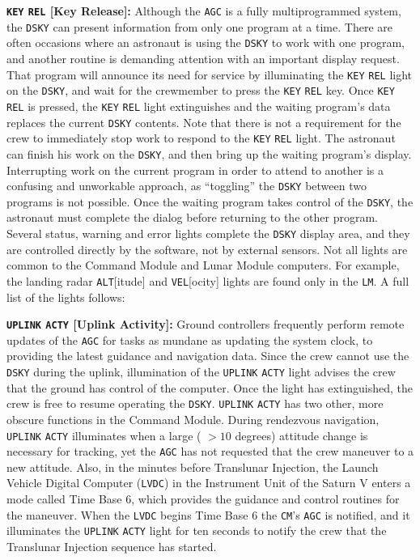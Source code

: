 \documentclass[refcap, oxford]{ahsan}
\begin{document}


\textbf{\texttt{KEY} \texttt{REL} [Key Release]:} Although the \texttt{AGC} is a fully multiprogrammed system, the \texttt{DSKY} can present information from only one program at a time. There are often occasions where an astronaut is using the \texttt{DSKY} to work with one program, and another routine is demanding attention with an important display request. That program will announce its need for service by illuminating the \texttt{KEY} \texttt{REL} light on the \texttt{DSKY}, and wait for the crewmember to press the \texttt{KEY} \texttt{REL} key. Once \texttt{KEY} \texttt{REL} is pressed, the \texttt{KEY} \texttt{REL} light extinguishes and the waiting program's data replaces the current \texttt{DSKY} contents. Note that there is not a requirement for the crew to immediately stop work to respond to the \texttt{KEY} \texttt{REL} light. The astronaut can finish his work on the \texttt{DSKY}, and then bring up the waiting program's display. Interrupting work on the current program in order to attend to another is a confusing and unworkable approach, as ``toggling'' the \texttt{DSKY} between two programs is not possible. Once the waiting program takes control of the \texttt{DSKY}, the astronaut must complete the dialog before returning to the other program. Several status, warning and error lights complete the \texttt{DSKY} display area, and they are controlled directly by the software, not by external sensors. Not all lights are common to the Command Module and Lunar Module computers. For example, the landing radar \texttt{ALT}[itude] and \texttt{VEL}[ocity] lights are found only in the \texttt{LM}. A full list of the lights follows:

\textbf{\texttt{UPLINK} \texttt{ACTY} [Uplink Activity]:} Ground controllers frequently perform remote updates of the \texttt{AGC} for tasks as mundane as updating the system clock, to providing the latest guidance and navigation data. Since the crew cannot use the \texttt{DSKY} during the uplink, illumination of the \texttt{UPLINK} \texttt{ACTY} light advises the crew that the ground has control of the computer. Once the light has extinguished, the crew is free to resume operating the \texttt{DSKY}. \texttt{UPLINK} \texttt{ACTY} has two other, more obscure functions in the Command Module. During rendezvous navigation, \texttt{UPLINK} \texttt{ACTY} illuminates when a large ( $>10$ degrees) attitude change is necessary for tracking, yet the \texttt{AGC} has not requested that the crew maneuver to a new attitude. Also, in the minutes before Translunar Injection, the Launch Vehicle Digital Computer (\texttt{LVDC}) in the Instrument Unit of the Saturn V enters a mode called Time Base 6, which provides the guidance and control routines for the maneuver. When the \texttt{LVDC} begins Time Base 6 the \texttt{CM}'s \texttt{AGC} is notified, and it illuminates the \texttt{UPLINK} \texttt{ACTY} light for ten seconds to notify the crew that the Translunar Injection sequence has started.
\end{document}
